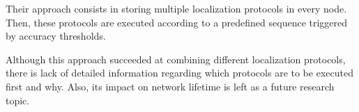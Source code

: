 Their approach consists in storing multiple localization protocols in every node. Then, these protocols are executed according to a predefined sequence triggered by accuracy thresholds. 

% 

Although this approach succeeded at combining different localization protocols, there is lack of detailed information regarding which protocols are to be executed first and why. Also, its impact on network lifetime is left as a future research topic.
